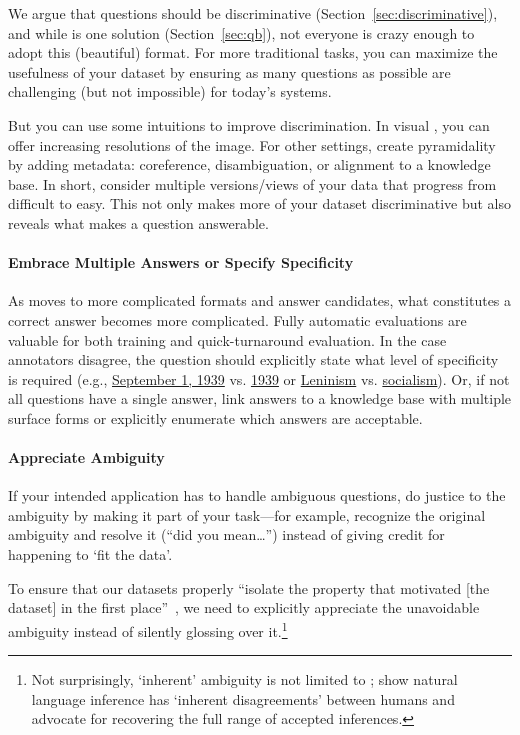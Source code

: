 We argue that questions should be discriminative (Section~\ref{sec:discriminative}), and while \qb{} is one solution (Section~\ref{sec:qb}), not everyone is crazy enough to adopt this (beautiful) format.
For more traditional  tasks, you can maximize the usefulness of your dataset by ensuring as many questions as possible are challenging (but not impossible) for today's  systems.

But you can use some \qb{} intuitions to improve discrimination.
In visual , you can offer increasing resolutions of the image.
For other settings, create pyramidality by adding metadata: coreference, disambiguation, or alignment to a knowledge base.
In short, consider multiple versions/views of your data that progress from difficult to easy.
This not only makes more of your dataset discriminative but also reveals what makes a question answerable.

\paragraph{Embrace Multiple Answers or Specify Specificity}

As \qa{} moves to more complicated formats and answer candidates, what constitutes a correct answer becomes more complicated.
Fully automatic evaluations are valuable for both training and quick-turnaround evaluation.
In the case annotators disagree, the question should explicitly state what level of specificity is required (e.g., \underline{September 1, 1939} vs. \underline{1939} or \underline{Leninism} vs. \underline{socialism}).
Or, if not all questions have a single answer, link answers to a knowledge base with multiple surface forms or explicitly enumerate which answers are acceptable.

\paragraph{Appreciate Ambiguity}

If your intended  application has to handle ambiguous questions,
do justice to the ambiguity by making it part of your task---for example, recognize the
original ambiguity and resolve it (``did you mean\dots'') instead of giving credit
for happening to `fit the data'.

To ensure that our datasets properly ``isolate the property that
motivated [the dataset] in the first place''~\cite{Zaenen-2006}, we
need to explicitly appreciate the unavoidable ambiguity instead of
silently glossing over it.\footnote{Not surprisingly, `inherent'
  ambiguity is not limited to ; \citet{pavlick-19} show
  natural language inference has `inherent disagreements'
  between humans and advocate for recovering the full range of
  accepted inferences.}

